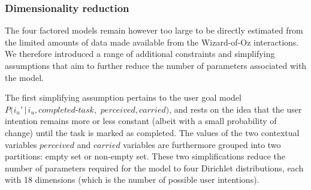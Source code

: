 \subsubsection*{Dimensionality reduction}


The four factored models remain however too large to be directly estimated from the limited amounts of data made available from the Wizard-of-Oz interactions.  We therefore introduced a range of additional constraints and simplifying assumptions that aim to further reduce the number of parameters associated with the model.


The first simplifying assumption pertains to the user goal model $P(i_u' \, | \, i_u, \mathit{completed\mbox{-}task},$ $\mathit{perceived}, \mathit{carried})$, and rests on the idea that the user intention remains more or less constant (albeit with a small probability of change) until the task is marked as completed. The values of the two contextual variables $\mathit{perceived}$ and $\mathit{carried}$ variables are furthermore grouped into two partitions: empty set or non-empty set. These two simplifications reduce the number of parameters required for the model to four Dirichlet distributions, each with 18 dimensions (which is the number of possible user intentions). 

